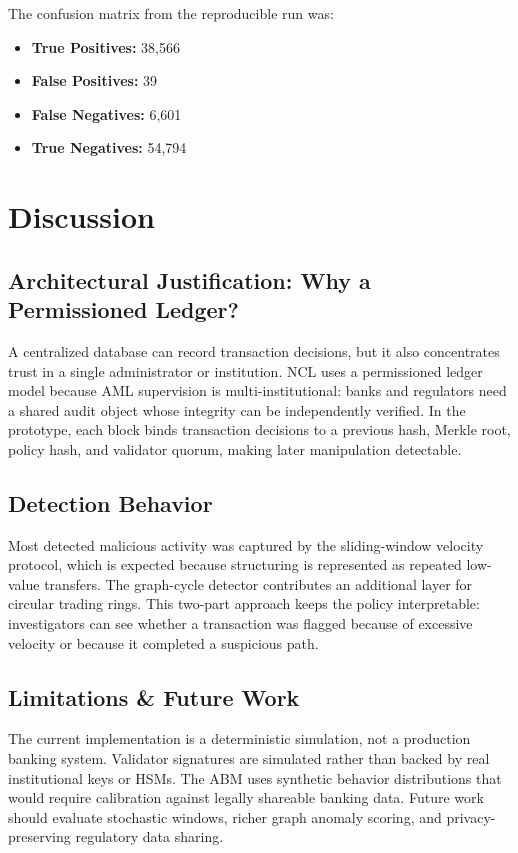 \documentclass[11pt, letterpaper]{article}
\begin{document}
The confusion matrix from the reproducible run was:
\begin{itemize}
    \item \textbf{True Positives:} 38,566
    \item \textbf{False Positives:} 39
    \item \textbf{False Negatives:} 6,601
    \item \textbf{True Negatives:} 54,794
\end{itemize}

\section{Discussion}
\subsection{Architectural Justification: Why a Permissioned Ledger?}
A centralized database can record transaction decisions, but it also concentrates trust in a single administrator or institution. NCL uses a permissioned ledger model because AML supervision is multi-institutional: banks and regulators need a shared audit object whose integrity can be independently verified. In the prototype, each block binds transaction decisions to a previous hash, Merkle root, policy hash, and validator quorum, making later manipulation detectable.

\subsection{Detection Behavior}
Most detected malicious activity was captured by the sliding-window velocity protocol, which is expected because structuring is represented as repeated low-value transfers. The graph-cycle detector contributes an additional layer for circular trading rings. This two-part approach keeps the policy interpretable: investigators can see whether a transaction was flagged because of excessive velocity or because it completed a suspicious path.

\subsection{Limitations \& Future Work}
The current implementation is a deterministic simulation, not a production banking system. Validator signatures are simulated rather than backed by real institutional keys or HSMs. The ABM uses synthetic behavior distributions that would require calibration against legally shareable banking data. Future work should evaluate stochastic windows, richer graph anomaly scoring, and privacy-preserving regulatory data sharing.
\end{document}
